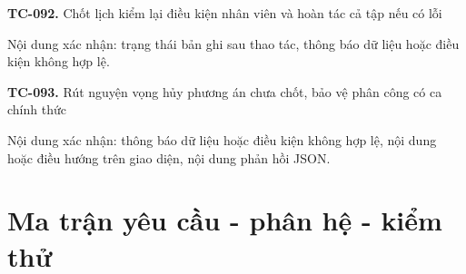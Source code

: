 \noindent\textbf{TC-092.} Chốt lịch kiểm lại điều kiện nhân viên và hoàn tác cả tập nếu có lỗi\par
Nội dung xác nhận:\allowbreak{} trạng thái bản ghi sau thao tác, thông báo dữ liệu hoặc điều kiện không hợp lệ.\allowbreak{}

\noindent\textbf{TC-093.} Rút nguyện vọng hủy phương án chưa chốt, bảo vệ phân công có ca chính thức\par
Nội dung xác nhận:\allowbreak{} thông báo dữ liệu hoặc điều kiện không hợp lệ, nội dung hoặc điều hướng trên giao diện, nội dung phản hồi JSON.\allowbreak{}

\endgroup
\clearpage

\section{Ma trận yêu cầu - phân hệ - kiểm thử}

